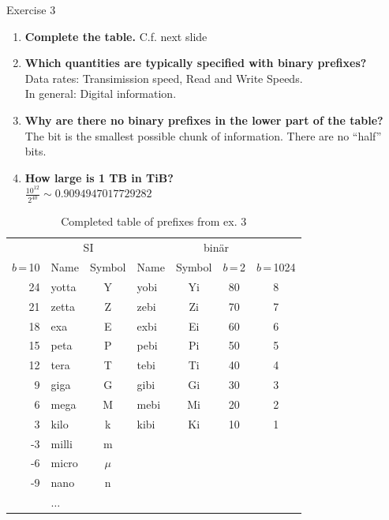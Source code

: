 \documentclass[10pt]{beamer}
\begin{document}
\begin{frame}[allowframebreaks]{Exercise 3}
		\begin{enumerate}
			\item \textbf{Complete the table.} C.f. next slide
			\item \textbf{Which quantities are typically specified with binary prefixes?} \\
			Data rates: Transimission speed, Read and Write Speeds. \\
			In general: Digital information.
			\item \textbf{ Why are there no binary prefixes in the lower part of the table?}\\ The bit is the smallest possible chunk of information. There are no "`half"' bits.
			\item \textbf{How large is 1 TB in TiB?} \\
                $\frac {10^{12}}{2^{40}} \sim 0.9094947017729282$
		\end{enumerate}
\framebreak
\begin{minipage}[t][\textheight][t]{\textwidth}
\begin{table}
\begin{center}
	\begin{tabular}[t]{@{}rlclccc@{}}
			\toprule
			& \multicolumn{2}{c}{SI} & \multicolumn{4}{c}{binär} \\ \cmidrule(lr){2-3} \cmidrule(lr){4-7}
			\tiny $b$\,=\,10 & \tiny Name & \tiny Symbol & \tiny Name & \tiny Symbol & \tiny $b$\,=\,2 & \tiny $b$\,=\,1024 \\
			\midrule
			24 & yotta  & Y & yobi & Yi & 80 & 8 \\ %
			21 & zetta  & Z & zebi & Zi & 70 & 7 \\ %
			18 & exa    & E & exbi & Ei & 60 & 6 \\ %
			15 & peta   & P & pebi & Pi & 50 & 5 \\ %
			12 & tera   & T & tebi & Ti & 40 & 4 \\ %
			9 & giga   & G & gibi & Gi & 30 & 3 \\ %
			6 & mega   & M & mebi & Mi & 20 & 2 \\ %
			3 & kilo   & k & kibi & Ki & 10 & 1 \\ %
			\hline
			-3 & milli  & m & \\
			-6 & micro  & $\mu$ & \\
			-9 & nano   & n & \\
			 & $\dots$  &  & \\
			\bottomrule
		\end{tabular}
		\caption{Completed table of prefixes from ex. 3}
\end{center}
\end{table}
\end{minipage}
\end{frame}
\end{document}
